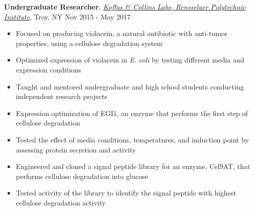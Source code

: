 \documentclass[10pt, line]{res}
\begin{document}
\begin{resume}
\textbf{Undergraduate Researcher}, \href{https://homepages.rpi.edu/~koffam/}{\sl Koffas \& Collins Labs, Rensselaer Polytechnic Institute}, Troy, NY  \hfill Nov 2015 - May 2017
\begin{itemize}
    \item Focused on producing violacein, a natural antibiotic with anti-tumor properties, using a cellulose degradation system
    \item Optimized expression of violacein in \textit{E. coli} by testing different media and expression conditions
    \item Taught and mentored undergraduate and high school students conducting independent research projects
    \item Expression optimization of  EGI1, an enzyme that performs the first step of cellulose degradation
    \item Tested the effect of media conditions, temperatures, and induction point by assessing protein secretion and activity
    \item Engineered and cloned a signal peptide library for an enzyme, Cel9AT, that performs cellulose degradation into glucose
    \item Tested activity of the library to identify the signal peptide with highest cellulose degradation activity
\end{itemize}
\vspace{-5pt}




\end{resume}
\end{document}
